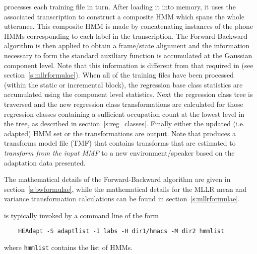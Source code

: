 
processes each training file in turn.
After loading it into memory, it uses the associated transcription to 
construct a  composite HMM which spans the whole utterance.
This composite HMM is made by concatenating instances of the phone HMMs 
corresponding to each label in the transcription. The Forward-Backward
algorithm is then applied to obtain a frame/state alignment and the
information  necessary to form the standard 
auxiliary function is accumulated at the Gaussian component
level. Note that this information is
different from that required in  (see
section~\ref{s:mllrformulae}).
When all of the training files have been processed (within the static
or incremental block), the regression
base class statistics are accumulated using the component level
statistics. 
Next the regression class tree is traversed and the new regression class 
transformations are calculated for those regression classes containing
a sufficient occupation count at the lowest level in the tree,
as described in section~\ref{s:reg_classes}. Finally
either the updated (i.e. adapted) HMM set or the transformations are output.
Note that  produces a transforms model file (TMF) that 
contains transforms that are estimated to \textit{transform from the
input MMF} to a new environment/speaker based on the adaptation data  
presented.


The mathematical details of the Forward-Backward algorithm are given
in section~\ref{s:bwformulae}, while the mathematical details for the
MLLR mean and variance transformation calculations can be found in
section~\ref{s:mllrformulae}.

 is typically invoked by a command line of the form
\begin{verbatim}
    HEAdapt -S adaptlist -I labs -H dir1/hmacs -M dir2 hmmlist
\end{verbatim}
where \texttt{hmmlist} contains the list of HMMs.  


